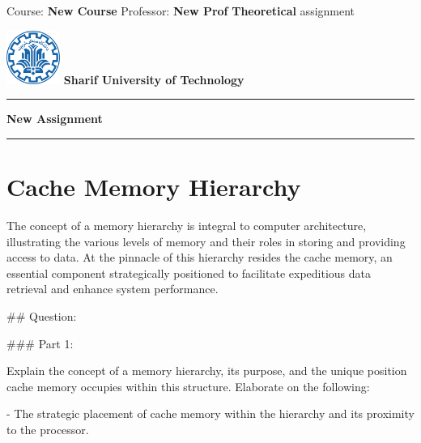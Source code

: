 \documentclass{article}%
\begin{document}
%
\normalsize%
\begin{minipage}{0.6\linewidth}%
\begin{flushleft}%
\large{Course: \textbf{New Course}}%
\vspace{0.1cm}%
\newline%
\vspace{0.1cm}%
\normalsize{Professor: \textbf{New Prof}}%
\newline%
\vspace{0.1cm}%
\normalsize{\textbf{Theoretical} assignment}%
\end{flushleft}%
\end{minipage}%
\begin{minipage}{0.36\linewidth}%
\begin{flushright}%
\includegraphics[width=1.75cm]{logo.png}%
\hfill%
\newline%
\hfill%
\textbf{\normalsize{Sharif University of Technology}}%
\end{flushright}%
\end{minipage}%
\begin{center}%
\hrule height 0.02cm%
\vspace{0.2cm}%
\large{\textbf{New Assignment}}%
\vspace{0.2cm}%
\hrule height 0.02cm%
\end{center}%
\section{\textbf{Cache Memory Hierarchy}}%
\label{sec:textbfCacheMemoryHierarchy}%
The concept of a memory hierarchy is integral to computer architecture, illustrating the various levels of memory and their roles in storing and providing access to data. At the pinnacle of this hierarchy resides the cache memory, an essential component strategically positioned to facilitate expeditious data retrieval and enhance system performance. 

## Question: 

### Part 1: 

Explain the concept of a memory hierarchy, its purpose, and the unique position cache memory occupies within this structure. Elaborate on the following: 

- The strategic placement of cache memory within the hierarchy and its proximity to the processor. 
\end{document}
